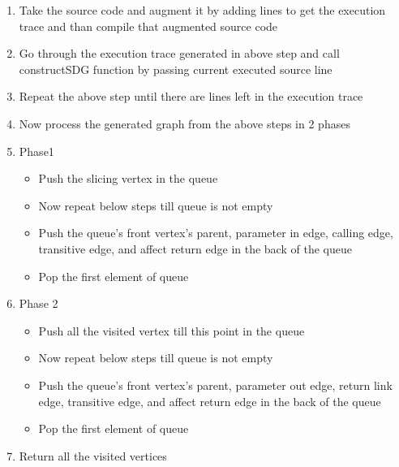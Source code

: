 \documentclass[conference]{IEEEtran}
\begin{document}
\begin{enumerate}
    	\item Take the source code and augment it by adding lines to get the execution trace and than compile that augmented source code
\item	Go through the execution trace generated in above step and call construct\textunderscore SDG function by passing current executed source line
\item	Repeat the above step until there are lines left in the execution trace
\item	Now process the generated graph from the above steps in 2 phases
\item	Phase1
\begin{itemize}
\item	Push the slicing vertex in the queue
\item	Now repeat below steps till queue is not empty
\item	Push the queue’s front vertex’s parent, parameter in edge, calling edge, transitive edge, and affect return edge in the back of the queue
\item	Pop the first element of queue
\end{itemize}
\item	Phase 2
\begin{itemize}
\item	Push all the visited vertex till this point in the queue
\item	Now repeat below steps till queue is not empty
\item	Push the queue’s front vertex’s parent, parameter out edge, return link edge, transitive edge, and affect return edge in the back of the queue
\item	Pop the first element of queue
\end{itemize}
\item Return all the visited vertices
\end{enumerate}
\end{document}
